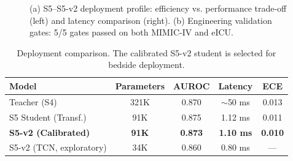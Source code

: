 \documentclass[11pt,a4paper]{article}
\begin{document}
\begin{figure}[htbp]

\vspace{0.5cm}

\caption{(a) S5--S5-v2 deployment profile: efficiency vs. performance trade-off (left) and latency comparison (right). (b) Engineering validation gates: 5/5 gates passed on both MIMIC-IV and eICU.}
\label{fig:s5}
\end{figure}

\begin{table}[htbp]
\centering
\caption{Deployment comparison. The calibrated S5-v2 student is selected for bedside deployment.}
\label{tab:s5}
\small
\begin{tabular}{lcccc}
\toprule
\textbf{Model} & \textbf{Parameters} & \textbf{AUROC} & \textbf{Latency} & \textbf{ECE} \\
\midrule
Teacher (S4) & 321K & 0.870 & $\sim$50 ms & 0.013 \\
S5 Student (Transf.) & 91K & 0.875 & 1.12 ms & 0.011 \\
\textbf{S5-v2 (Calibrated)} & \textbf{91K} & \textbf{0.873} & \textbf{1.10 ms} & \textbf{0.010} \\
S5-v2 (TCN, exploratory) & 34K & 0.860 & 0.80 ms & --- \\
\bottomrule
\end{tabular}
\end{table}
\end{document}
